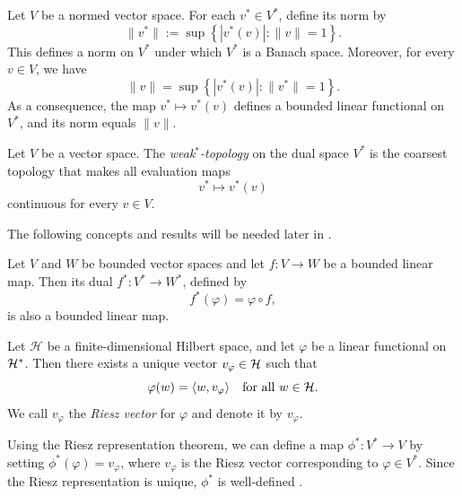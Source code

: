 

\begin{theorem} \cite[Theorem 4.3]{rudin91functional} %
Let \( V \) be a normed vector space. For each \( v^* \in V^* \), define its norm by
\[
\|v^*\| := \sup \left\{ | v^*(v) | : \|v\| = 1 \right\}.
\]
This defines a norm on \( V^* \) under which \( V^* \) is a Banach space. Moreover, for every \( v \in V \), we have
\[
\|v\| = \sup \left\{ | v^*(v) | : \|v^*\| = 1 \right\}.
\]
As a consequence, the map \( v^* \mapsto v^*(v)  \) defines a bounded linear functional on \( V^* \), and its norm equals \( \|v\| \).
\end{theorem}

\begin{definition} \label{def:weak*_top}
Let \( V \) be a vector space. The \emph{weak\(^*\)-topology} on the dual space \( V^* \) is the coarsest topology that makes all evaluation maps
\[
v^* \mapsto v^*(v) 
\]
continuous for every \( v \in V \).
\end{definition}




The following concepts and results will be needed later in .

\begin{proposition} \cite[Proposition 2.3.10]{pedersenAnalysisNow1989}
  Let $V$ and $W$ be bounded vector spaces and let \( f : V \to W \) be a bounded linear map. Then its dual \( f^* : V^* \to W^* \), defined by
\[
f^*(\varphi) = \varphi \circ f,
\]
is also a bounded linear map.
\end{proposition}


\begin{theorem} \cite[Theorem 9.15]{romanAdvancedLinearAlgebra1992}
Let $\mathcal{H}$ be a finite-dimensional Hilbert space, and let $\varphi$ be a linear functional on $\mathcal{H}^*$. Then there exists a unique vector $v_\varphi \in \mathcal{H}$ such that
\[
\varphi(w) = \langle w, v_\varphi \rangle \quad \text{for all } w \in  \mathcal{H}.
\]
We call $v_\varphi$ the \emph{Riesz vector} for $\varphi$ and denote it by $v_\varphi$.\\
\end{theorem}


Using the Riesz representation theorem, we can define a map 
$\phi^* : V^* \to V$
by setting \(\phi^*(\varphi) = v_\varphi\), where \(v_\varphi\) is the Riesz vector corresponding to \(\varphi \in V^*\). Since the Riesz representation is unique, \(\phi^*\) is well-defined \cite{romanAdvancedLinearAlgebra1992}. 

